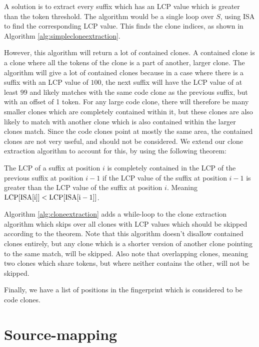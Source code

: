 A solution is to extract every suffix which has an LCP value which is greater than the
token threshold. The algorithm would be a single loop over $S$, using ISA to find the
corresponding LCP value. This finds the clone indices, as shown in Algorithm
\ref{alg:simplecloneextraction}.


However, this algorithm will return a lot of contained clones. A contained clone is a
clone where all the tokens of the clone is a part of another, larger clone. The algorithm
will give a lot of contained clones because in a case where there is a suffix with an LCP
value of $100$, the next suffix will have the LCP value of at least $99$ and likely
matches with the same code clone as the previous suffix, but with an offset of 1 token.
For any large code clone, there will therefore be many smaller clones which are completely
contained within it, but these clones are also likely to match with another clone which is
also contained within the larger clones match. Since the code clones point at mostly the
same area, the contained clones are not very useful, and should not be considered. We
extend our clone extraction algorithm to account for this, by using the following theorem:

\begin{theorem} 

    The LCP of a suffix at position $i$ is completely contained in the LCP of the previous
    suffix at position $i - 1$ if the LCP value of the suffix at position $i - 1$ is
    greater than the LCP value of the suffix at position $i$. Meaning $\mathrm{LCP}[{\mathrm{ISA}[{\mathrm{i}}]}]
    < \mathrm{LCP}[{\mathrm{ISA}[{\mathrm{i} - 1}]}]$.


\end{theorem}


Algorithm \ref{alg:cloneextraction} adds a while-loop to the clone extraction algorithm
which skips over all clones with LCP values which should be skipped according to the
theorem. Note that this algorithm doesn't disallow contained clones entirely, but any
clone which is a shorter version of another clone pointing to the same match, will be
skipped. Also note that overlapping clones, meaning two clones which share tokens, but
where neither contains the other, will not be skipped.



Finally, we have a list of positions in the fingerprint which is considered to be code
clones.

\section{Source-mapping}

